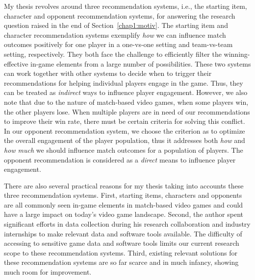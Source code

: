 My thesis revolves around three recommendation systems, i.e., the starting item, character and opponent recommendation systems, for answering the research question raised in the end of Section~\ref{chap1:motiv}. The starting item and character recommendation systems exemplify \textit{how} we can influence match outcomes positively for one player in a one-vs-one setting and team-vs-team setting, respectively. They both face the challenge to efficiently filter the winning-effective in-game elements from a large number of possibilities. These two systems can work together with other systems to decide when to trigger their recommendations for helping individual players engage in the game. Thus, they can be treated as \textit{indirect} ways to influence player engagement. However, we also note that due to the nature of match-based video games, when some players win, the other players lose. When multiple players are in need of our recommendations to improve their win rate, there must be certain criteria for solving this conflict. In our opponent recommendation system, we choose the criterion as to optimize the overall engagement of the player population, thus it addresses both \textit{how} and \textit{how much} we should influence match outcomes for a population of players. The opponent recommendation is considered as a \textit{direct} means to influence player engagement.

There are also several practical reasons for my thesis taking into accounts these three recommendation systems. First, starting items, characters and opponents are all commonly seen in-game elements in match-based video games and could have a large impact on today's video game landscape.  Second, the author spent significant efforts in data collection during his research collaboration and industry internships to make relevant data and software tools available. The difficulty of accessing to sensitive game data and software tools limits our current research scope to these recommendation systems. Third, existing relevant solutions for these recommendation systems are so far scarce and in much infancy, showing much room for improvement. 

